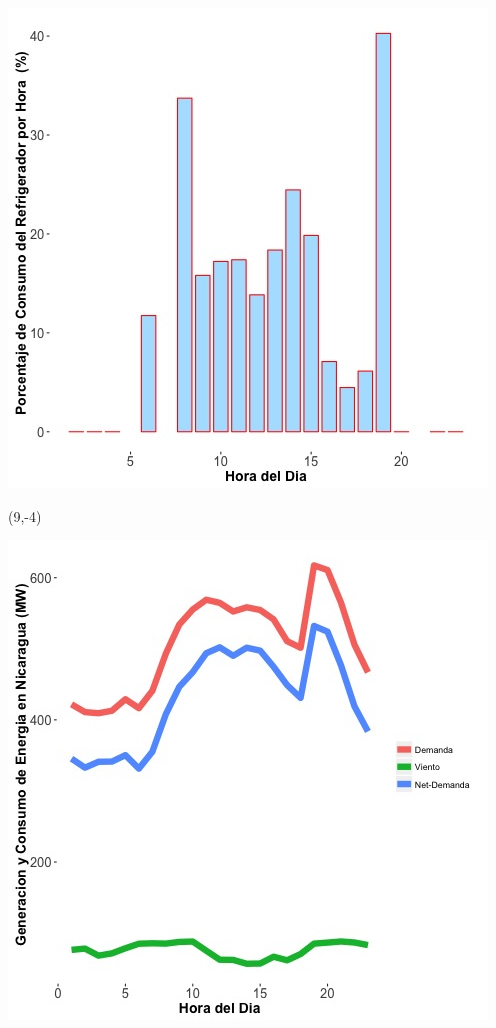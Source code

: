 \documentclass{article}\usepackage[]{graphicx}\usepackage[]{color}
\newenvironment{knitrout}{}{} %
\begin{document}
\begin{knitrout}
\color{fgcolor}
\includegraphics[scale=0.65]{figure/A28_fridge_energy_pct.jpg} 
\end{knitrout}

 \begin{textblock}{1}(9,-4)
\begin{minipage}{20em}
\begingroup

\endgroup
\end{minipage}
\end{textblock}

\vspace{20cm}

\begin{knitrout}
\color{fgcolor}
\includegraphics[scale=0.65]{figure/gridplot1.jpg} 
\end{knitrout}
\end{document}
